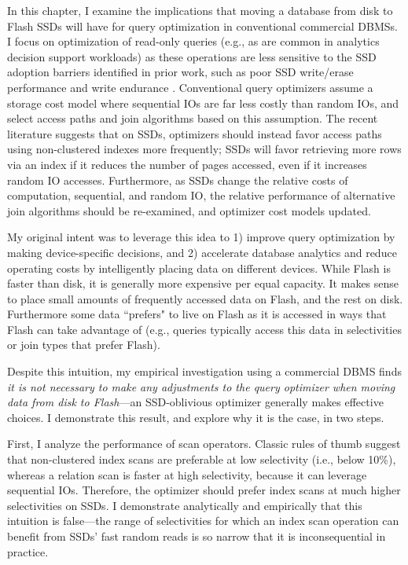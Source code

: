 In this chapter, I examine the implications that moving a database from disk to Flash SSDs will have for query optimization in conventional commercial DBMSs.
I focus on optimization of read-only queries (e.g., as are common in analytics decision support workloads) as these operations are less sensitive to the SSD adoption barriers identified in prior work, such as poor SSD write/erase performance \cite{Chen2009} and write endurance \cite{Roberts2009}.
Conventional query optimizers assume a storage cost model where sequential IOs are far less costly than random IOs, and select access paths and join algorithms based on this assumption.
The recent literature \cite{Baumann2010} suggests that on SSDs, optimizers should instead favor access paths using non-clustered indexes more frequently; SSDs will favor retrieving more rows via an index if it reduces the number of pages accessed, even if it increases random IO accesses.
Furthermore, as SSDs change the relative costs of computation, sequential, and random IO, the relative performance of alternative join algorithms should be re-examined, and optimizer cost models updated.

My original intent was to leverage this idea to 1) improve query optimization by making device-specific decisions, and 2) accelerate database analytics and reduce operating costs by intelligently placing data on different devices.
While Flash is faster than disk, it is generally more expensive per equal capacity.
It makes sense to place small amounts of frequently accessed data on Flash, and the rest on disk.
Furthermore some data ``prefers" to live on Flash as it is accessed in ways that Flash can take advantage of (e.g., queries typically access this data in selectivities or join types that prefer Flash).

Despite this intuition, my empirical investigation using a commercial DBMS finds \emph{it is not necessary to make any adjustments to the query optimizer when moving data from disk to Flash}---an SSD-oblivious optimizer generally makes effective choices.
I demonstrate this result, and explore why it is the case, in two steps.

First, I analyze the performance of scan operators.  
Classic rules of thumb suggest that non-clustered index scans are preferable at low selectivity (i.e., below 10\%), whereas a relation scan is faster at high selectivity, because it can leverage sequential IOs.
Therefore, the optimizer should prefer index scans at much higher selectivities on SSDs.  
I demonstrate analytically and empirically that this intuition is false---the range of selectivities for which an index scan operation can benefit from SSDs' fast random reads is so narrow that it is inconsequential in practice.


